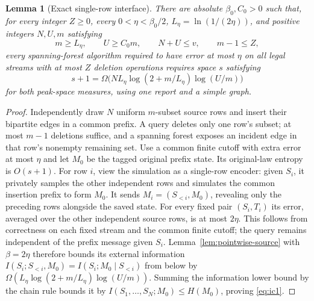 \documentclass[11pt,letterpaper]{article}
\newtheorem{lemma}[theorem]{Lemma}
\numberwithin{equation}{section}
\begin{document}
\begin{lemma}[Exact single-row interface]
\label{lem:exact-row-interface}
There are absolute $\beta_0,C_0>0$ such that, for every integer $Z\ge0$, every $0<\eta<\beta_0/2$, $L_\eta=\ln(1/(2\eta))$, and positive integers $N,U,m$ satisfying
\[
 m\ge L_\eta,\qquad U\ge C_0m,\qquad N+U\le v,
 \qquad m-1\le Z,
\]
every spanning-forest algorithm required to have error at most $\eta$ on all legal streams with at most $Z$ deletion operations requires space $s$ satisfying
\begin{equation}
s+1=\Omega\bigl(NL_\eta\log(2+m/L_\eta)\log(U/m)\bigr)
 \label{eq:ic1}
\end{equation}
for both peak-space measures, using one report and a simple graph.
\end{lemma}
\begin{proof}
Independently draw $N$ uniform $m$-subset source rows and insert their bipartite edges in a common prefix.
A query deletes only one row's subset; at most $m-1$ deletions suffice, and a spanning forest exposes an incident edge in that row's nonempty remaining set.
Use a common finite cutoff with extra error at most $\eta$ and let $M_0$ be the tagged original prefix state.
Its original-law entropy is $O(s+1)$.
For row $i$, view the simulation as a single-row encoder: given $S_i$, it privately samples the other independent rows and simulates the common insertion prefix to form $M_0$.
It sends $M_i=(S_{<i},M_0)$, revealing only the preceding rows alongside the saved state.
For every fixed pair $(S_i,T_i)$ its error, averaged over the other independent source rows, is at most $2\eta$.
This follows from correctness on each fixed stream and the common finite cutoff; the query remains independent of the prefix message given $S_i$.
Lemma~\ref{lem:pointwise-source} with $\beta=2\eta$ therefore bounds its external information $I(S_i;S_{<i},M_0)=I(S_i;M_0\mid S_{<i})$ from below by $\Omega(L_\eta\log(2+m/L_\eta)\log(U/m))$.
Summing the information lower bound by the chain rule bounds it by $I(S_1,\ldots,S_N;M_0)\le H(M_0)$, proving \eqref{eq:ic1}.
\end{proof}
\end{document}
